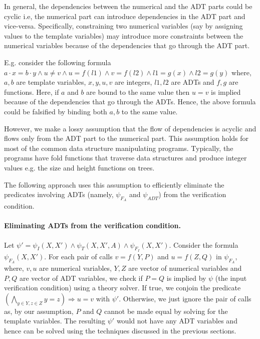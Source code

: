 \documentclass[a4paper,10pt]{article}
\begin{document}
In general, the dependencies between the numerical and the ADT parts could be cyclic i.e, 
the numerical part can introduce dependencies in the ADT part and vice-versa. 
Specifically, constraining two numerical variables (say by assigning values to the template variables) 
may introduce more constraints between the numerical variables because of the dependencies that go through the ADT part.

E.g. consider the following formula 
$a \cdot x = b \cdot y \wedge u \ne v \wedge u = f(l1) \wedge v = f(l2) \wedge l1 = g(x) \wedge l2 = g(y)$ where, $a,b$ are template variables, $x,y,u,v$ are integers, $l1,l2$ are ADTs and $f,g$ are functions. 
Here, if $a$ and $b$ are bound to the same value then $u = v$  is implied because of the dependencies 
that go through the ADTs. Hence, the above formula could be falsified by binding both $a,b$ to the same value.

However, we make a lossy assumption that the flow of dependencies is acyclic and 
flows only from the ADT part to the numerical part. This assumption holds for most of the common 
data structure manipulating programs. 
Typically, the programs have fold functions that traverse data structures and produce integer values 
e.g. the size and height functions on trees. 


The following approach uses this assumption to efficiently eliminate the predicates involving ADTs 
(namely, $\psi_{F_A}$ and $\psi_{ADT}$) from the verification condition.

\paragraph{Eliminating ADTs from the verification condition.}

Let $\psi' = \psi_I(X,X') \wedge \psi_T(X,X',A) \wedge \psi_{F_I}(X,X')$.
Consider the formula $\psi_{F_A}(X,X')$. For each pair of calls 
$v = f(Y,P)$ and $u = f(Z,Q)$ in $\psi_{F_A}$, where, $v,u$ are numerical variables, 
$Y,Z$ are vector of numerical variables
and $P,Q$ are vector of ADT variables, we check if $P = Q$ is implied by $\psi$ (the input verification condition)
using a theory solver.
If true, we conjoin the predicate $(\bigwedge_{y \in Y, z \in Z} y = z) \Rightarrow u = v$ with $\psi'$.
Otherwise, we just ignore the pair of calls as, by our assumption, $P$ and $Q$ cannot be made
equal by solving for the template variables.
The resulting $\psi'$ would not have any ADT variables and hence can be solved using the techniques
discussed in the previous sections.
\end{document}
